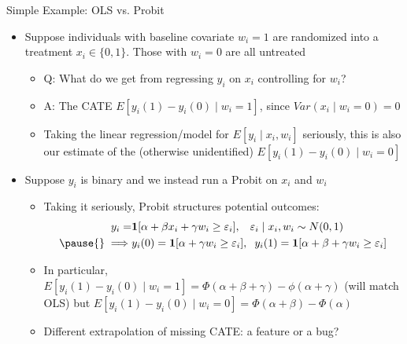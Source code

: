 \documentclass[11pt,english]{beamer}
\begin{document}
\begin{frame}{Simple Example: OLS vs. Probit}
\begin{itemize}
\item Suppose individuals with baseline covariate $w_i=1$ are randomized into a treatment $x_i\in\{0,1\}$. Those with $w_i=0$ are all untreated\smallskip\pause{}
\begin{itemize}
\item Q: What do we get from regressing $y_i$ on $x_i$ controlling for $w_i$?\smallskip\pause{}
\item A: The CATE $E[y_i(1)-y_i(0)\mid w_i=1]$, since $Var(x_i\mid w_i=0)=0$\smallskip\pause{}
\item Taking the linear regression/model for $E[y_i\mid x_i,w_i]$ seriously, this is also our estimate of the (otherwise unidentified) $E[y_i(1)-y_i(0)\mid w_i=0]$
\end{itemize}\bigskip\pause{}
\item Suppose $y_i$ is binary and we instead run a Probit on $x_i$ and $w_i$\smallskip
\begin{itemize}
\item Taking it seriously, Probit structures potential outcomes:
\begin{align*}
 y_i=& \mathbf{1}[\alpha+\beta x_i+\gamma w_i\ge\varepsilon_i],\hspace{0.3cm} \varepsilon_i\mid x_i,w_i\sim N(0,1) \\
\pause{} \implies &  y_i(0)=\mathbf{1}[\alpha+\gamma w_i\ge \varepsilon_i],\hspace{0.2cm}y_i(1)=\mathbf{1}[\alpha+\beta + \gamma w_i\ge \varepsilon_i]
\end{align*}\pause{}\vspace{-0.2cm}
\item In particular, $E[y_i(1)-y_i(0)\mid w_i=1]=\Phi(\alpha+\beta+\gamma)-\phi(\alpha+\gamma)$ (will match OLS) but $E[y_i(1)-y_i(0)\mid w_i=0]=\Phi(\alpha+\beta)-\Phi(\alpha)$\smallskip\pause{}
\item Different extrapolation of missing CATE: a feature or a bug?
\end{itemize}
\end{itemize}
\end{frame}
\end{document}
